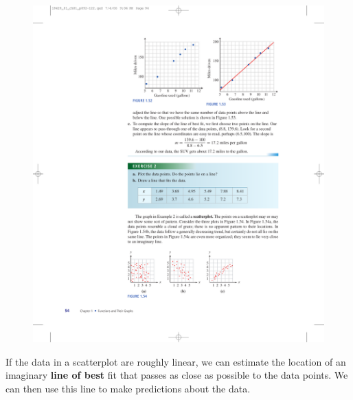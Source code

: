 \documentclass[10pt,]{book}
\newcommand{\terminology}[1]{\textbf{#1}}
\theoremstyle{plain}
\theoremstyle{definition}
\theoremstyle{definition}
\theoremstyle{definition}
\theoremstyle{definition}
\numberwithin{equation}{part}
\begin{document}
\begin{figure}
\centering
\includegraphics[width=1\linewidth]{images/fig-scatterplots}
\caption{\label{fig-scatterplots}}
\end{figure}
If the data in a scatterplot are roughly linear, we can estimate the location of an imaginary \terminology{line of best} fit that passes as close as possible to the data points. We can then use this line to make predictions about the data.%
\typeout{************************************************}
\typeout{************************************************}
\end{document}
